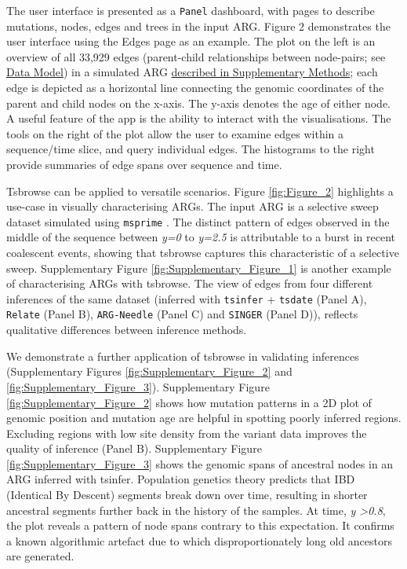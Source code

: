 \documentclass[unnumsec,webpdf,contemporary,large,namedate]{oup-authoring-template}%
\begin{document}
The user interface is presented as a \texttt{Panel} dashboard, with pages to describe mutations, nodes, edges and trees in the input ARG. Figure 2 demonstrates the user interface using the Edges page as an example. The plot on the left is an overview of all 33,929 edges (parent-child relationships between node-pairs; see \hyperref[subsec:Data_Model]{Data Model}) in a simulated ARG \hyperref[subsec:sweep_simulation]{described in Supplementary Methods}; each edge is depicted as a horizontal line connecting the genomic coordinates of the parent and child nodes on the x-axis. The y-axis denotes the age of either node. A useful feature of the app is the ability to interact with the visualisations. The tools on the right of the plot allow the user to examine edges within a sequence/time slice, and query individual edges. The histograms to the right provide summaries of edge spans over sequence and time.

 Tsbrowse can be applied to versatile scenarios. Figure \ref{fig:Figure_2} highlights a use-case in visually characterising ARGs. The input ARG is a selective sweep dataset simulated using \texttt{msprime} \citep{Baumdicker2021}. The distinct pattern of edges observed in the middle of the sequence between \textit{y=0} to \textit{y=2.5} is attributable to a burst in recent coalescent events, showing that tsbrowse captures this characteristic of a selective sweep. Supplementary Figure \ref{fig:Supplementary_Figure_1} is another example of characterising ARGs with tsbrowse. The view of edges from four different inferences of the same dataset (inferred with \texttt{tsinfer} + \texttt{tsdate} (Panel A), \texttt{Relate} (Panel B), \texttt{ARG-Needle} (Panel C) and \texttt{SINGER} (Panel D)), reflects qualitative differences between inference methods. 

We demonstrate a further application of tsbrowse in validating inferences (Supplementary Figures \ref{fig:Supplementary_Figure_2} and \ref{fig:Supplementary_Figure_3}). Supplementary Figure \ref{fig:Supplementary_Figure_2} shows how mutation patterns in a 2D plot of genomic position and mutation age are helpful in spotting poorly inferred regions. Excluding regions with low site density from the variant data improves the quality of inference (Panel B). Supplementary Figure \ref{fig:Supplementary_Figure_3} shows the genomic spans of ancestral nodes in an ARG inferred with tsinfer. Population genetics theory predicts that IBD (Identical By Descent) segments break down over time, resulting in shorter ancestral segments further back in the history of the samples. At time, \textit{y \textgreater{0.8}}, the plot reveals a pattern of node spans contrary to this expectation. It confirms a known algorithmic artefact due to which disproportionately long old ancestors are generated.
\end{document}
